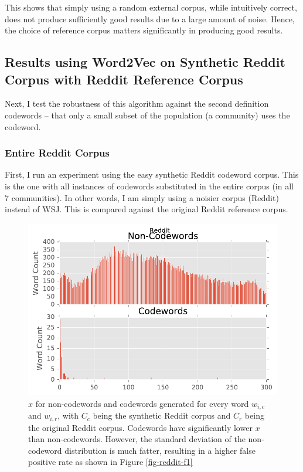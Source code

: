 This shows that simply using a random external corpus, while intuitively correct, does not produce sufficiently good results due to a large amount of noise. Hence, the choice of reference corpus matters significantly in producing good results.

\subsection{Results using Word2Vec on Synthetic Reddit Corpus with Reddit Reference Corpus}

Next, I test the robustness of this algorithm against the second definition codewords -- that only a small subset of the population (a community) uses the codeword.

\subsubsection{Entire Reddit Corpus}

First, I run an experiment using the easy synthetic Reddit codeword corpus. This is the one with all instances of codewords substituted in the entire corpus (in all 7 communities). In other words, I am simply using a noisier corpus (Reddit) instead of WSJ. This is compared against the original Reddit reference corpus.

\begin{figure}[h]
\centering
\includegraphics[width=.5\textwidth]{figures/reddit-count.pdf}
\caption{$x$ for non-codewords and codewords generated for every word $w_{i, c}$ and $w_{i, r}$, with $C_c$ being the synthetic Reddit corpus and $C_r$ being the original Reddit corpus. Codewords have significantly lower $x$ than non-codewords. However, the standard deviation of the non-codeword distribution is much fatter, resulting in a higher false positive rate as shown in Figure \ref{fig-reddit-f1}}
\label{fig-reddit-count}
\end{figure}

